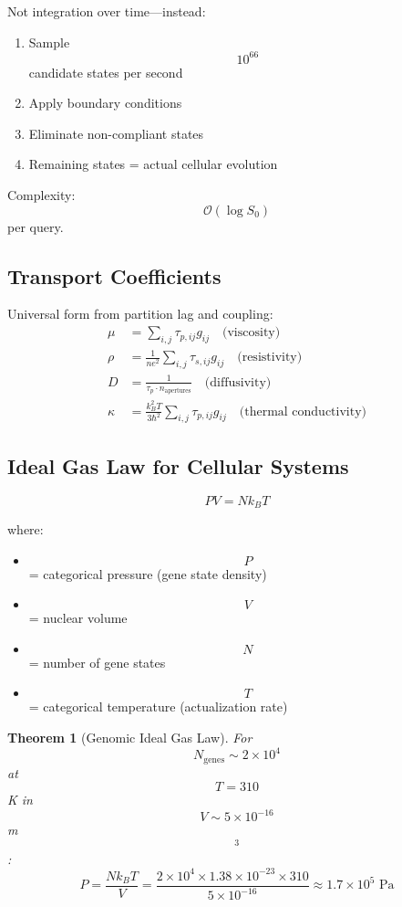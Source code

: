 \documentclass[11pt,twocolumn,a4paper]{article}
\newtheorem{theorem}{Theorem}[section]
\theoremstyle{remark}
\begin{document}
Not integration over time---instead:
\begin{enumerate}
\item Sample $$10^{66}$$ candidate states per second
\item Apply boundary conditions
\item Eliminate non-compliant states
\item Remaining states = actual cellular evolution
\end{enumerate}

Complexity: $$\mathcal{O}(\log S_0)$$ per query.

\subsection{Transport Coefficients}

Universal form from partition lag and coupling:
\begin{align}
\mu &= \sum_{i,j} \tau_{p,ij} g_{ij} \quad \text{(viscosity)} \\
\rho &= \frac{1}{ne^2}\sum_{i,j} \tau_{s,ij} g_{ij} \quad \text{(resistivity)} \\
D &= \frac{1}{\tau_p \cdot n_{\mathrm{apertures}}} \quad \text{(diffusivity)} \\
\kappa &= \frac{k_B^2 T}{3\hbar^2}\sum_{i,j} \tau_{p,ij} g_{ij} \quad \text{(thermal conductivity)}
\end{align}

\subsection{Ideal Gas Law for Cellular Systems}

\begin{equation}
PV = Nk_BT
\end{equation}

where:
\begin{itemize}
\item $$P$$ = categorical pressure (gene state density)
\item $$V$$ = nuclear volume
\item $$N$$ = number of gene states
\item $$T$$ = categorical temperature (actualization rate)
\end{itemize}

\begin{theorem}[Genomic Ideal Gas Law]
\label{thm:genomic_ideal_gas}
For $$N_{\mathrm{genes}} \sim 2 \times 10^4$$ at $$T = 310$$ K in $$V \sim 5 \times 10^{-16}$$ m$$^3$$:
$$
P = \frac{Nk_BT}{V} = \frac{2 \times 10^4 \times 1.38 \times 10^{-23} \times 310}{5 \times 10^{-16}} \approx 1.7 \times 10^5 \text{ Pa}
$$
\end{theorem}
\end{document}
